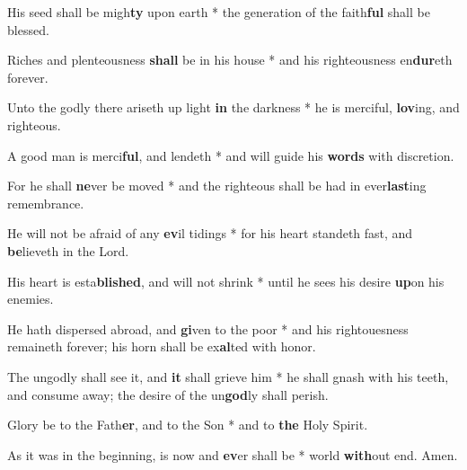\begin{multicols}{2}
	His seed shall be migh\textbf{ty} upon earth * the generation of the faith\textbf{ful} shall be blessed.
	
	Riches and plenteousness \textbf{shall} be in his house * and his righteousness en\textbf{dur}eth forever.
	
	Unto the godly there ariseth up light \textbf{in} the darkness * he is merciful, \textbf{lov}ing, and righteous.
	
	A good man is merci\textbf{ful}, and lendeth * and will guide his \textbf{words} with discretion.
	
	For he shall \textbf{ne}ver be moved * and the righteous shall be had in ever\textbf{last}ing remembrance.
	
	He will not be afraid of any \textbf{ev}il tidings * for his heart standeth fast, and \textbf{be}lieveth in the Lord.
	
	His heart is esta\textbf{blished}, and will not shrink * until he sees his desire \textbf{up}on his enemies.
	
	He hath dispersed abroad, and \textbf{gi}ven to the poor * and his rightouesness remaineth forever; his horn shall be ex\textbf{al}ted with honor.
	
	The ungodly shall see it, and \textbf{it} shall grieve him * he shall gnash with his teeth, and consume away; the desire of the un\textbf{god}ly shall perish.
	
	Glory be to the Fath\textbf{er}, and to the Son * and to \textbf{the} Holy Spirit.
	
	As it was in the beginning, is now and \textbf{ev}er shall be * world \textbf{with}out end. Amen.
\end{multicols}